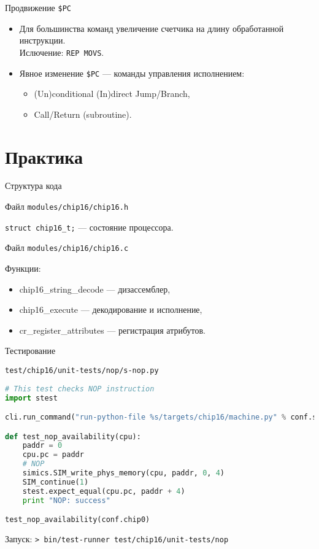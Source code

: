 \begin{frame}{Продвижение \texttt{\$PC}}

\begin{itemize}
    \item Для большинства команд увеличение счетчика на длину обработанной инструкции. \\
    Ислючение: \texttt{REP MOVS}.
    \pause\bigskip
    \item Явное изменение \texttt{\$PC} --- команды управления исполнением:
    \begin{itemize}
        \item (Un)conditional (In)direct Jump/Branch,
        \item Call/Return (subroutine).
    \end{itemize}
\end{itemize}

\end{frame}

\ifilab
\section{Практика}

\begin{frame}{Структура кода}

Файл \texttt{modules/chip16/chip16.h}

\texttt{struct chip16\_t;} --- состояние процессора.

\pause\bigskip

Файл \texttt{modules/chip16/chip16.c}

Функции:

\begin{itemize}
    \item chip16\_string\_decode --- дизассемблер,
    \item chip16\_execute --- декодирование и исполнение,
    \item cr\_register\_attributes --- регистрация атрибутов.
\end{itemize}

\end{frame}

\begin{frame}[fragile]{Тестирование}

\texttt{test/chip16/unit-tests/nop/s-nop.py}

\begin{lstlisting}[language=python, basicstyle=\scriptsize]
# This test checks NOP instruction
import stest

cli.run_command("run-python-file %s/targets/chip16/machine.py" % conf.sim.workspace)

def test_nop_availability(cpu):
    paddr = 0
    cpu.pc = paddr
    # NOP
    simics.SIM_write_phys_memory(cpu, paddr, 0, 4)
    SIM_continue(1)
    stest.expect_equal(cpu.pc, paddr + 4)
    print "NOP: success"

test_nop_availability(conf.chip0)
\end{lstlisting}

Запуск: \texttt{> bin/test-runner test/chip16/unit-tests/nop}
\end{frame}

